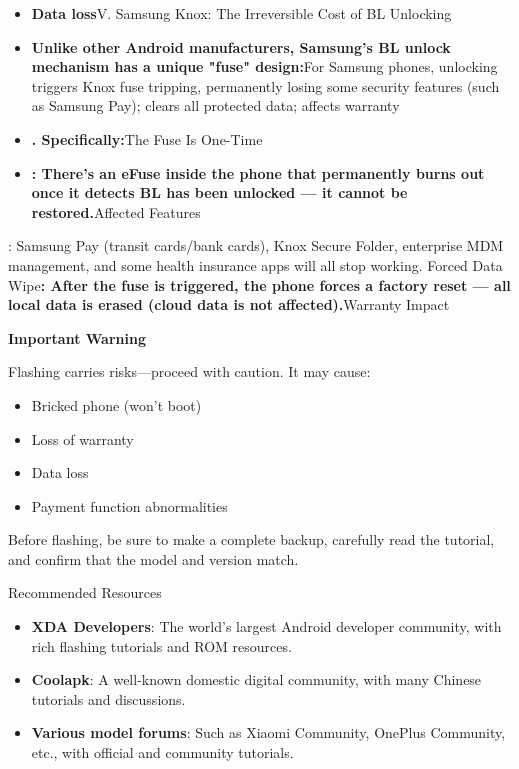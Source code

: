 \begin{itemize}
  \item \textbf{Data loss}V. Samsung Knox: The Irreversible Cost of BL Unlocking
  \item \textbf{Unlike other Android manufacturers, Samsung's BL unlock mechanism has a unique "fuse" design:}For Samsung phones, unlocking triggers Knox fuse tripping, permanently losing some security features (such as Samsung Pay); clears all protected data; affects warranty
  \item \textbf{. Specifically:}The Fuse Is One-Time
  \item \textbf{: There's an eFuse inside the phone that permanently burns out once it detects BL has been unlocked — it cannot be restored.}Affected Features
\end{itemize}

\begin{tcbwarn}{: Samsung Pay (transit cards/bank cards), Knox Secure Folder, enterprise MDM management, and some health insurance apps will all stop working.}
Forced Data Wipe\textbf{: After the fuse is triggered, the phone forces a factory reset — all local data is erased (cloud data is not affected).}Warranty Impact

\end{tcbwarn}

\textbf{Important Warning}\par

Flashing carries risks—proceed with caution. It may cause:

\begin{itemize}
  \item Bricked phone (won’t boot)
  \item Loss of warranty
  \item Data loss
  \item Payment function abnormalities
\end{itemize}

Before flashing, be sure to make a complete backup, carefully read the tutorial, and confirm that the model and version match.

\begin{tcbinfo}{Recommended Resources}
\begin{itemize}
  \item \textbf{XDA Developers}: The world's largest Android developer community, with rich flashing tutorials and ROM resources.
  \item \textbf{Coolapk}: A well-known domestic digital community, with many Chinese tutorials and discussions.
  \item \textbf{Various model forums}: Such as Xiaomi Community, OnePlus Community, etc., with official and community tutorials.
\end{itemize}

\end{tcbinfo}

